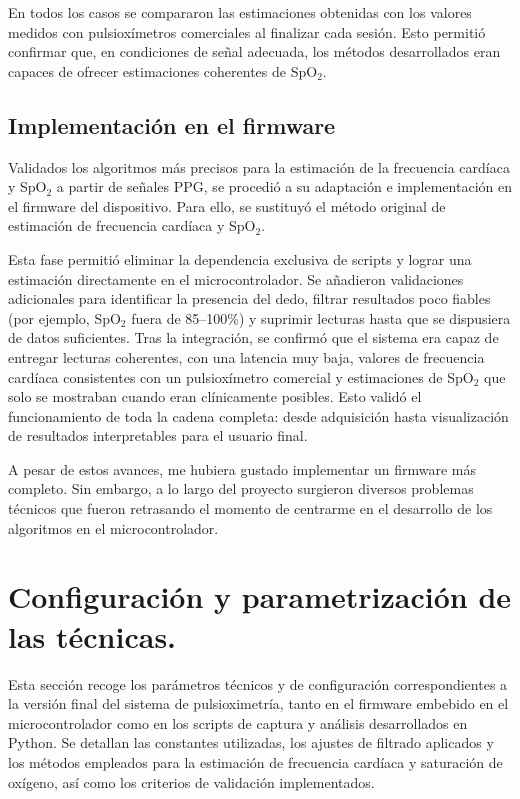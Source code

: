 En todos los casos se compararon las estimaciones obtenidas con los valores medidos con pulsioxímetros comerciales al finalizar cada sesión. Esto permitió confirmar que, en condiciones de señal adecuada, los métodos desarrollados eran capaces de ofrecer estimaciones coherentes de SpO$_2$.

\subsection{Implementación en el firmware}

Validados los algoritmos más precisos para la estimación de la frecuencia cardíaca y SpO$_2$ a partir de señales PPG, se procedió a su adaptación e implementación en el firmware del dispositivo. Para ello, se sustituyó el método original de estimación de frecuencia cardíaca y SpO$_2$.

Esta fase permitió eliminar la dependencia exclusiva de scripts y lograr una estimación directamente en el microcontrolador. Se añadieron validaciones adicionales para identificar la presencia del dedo, filtrar resultados poco fiables (por ejemplo, SpO$_2$ fuera de 85–100\%) y suprimir lecturas hasta que se dispusiera de datos suficientes. Tras la integración, se confirmó que el sistema era capaz de entregar lecturas coherentes, con una latencia muy baja, valores de frecuencia cardíaca consistentes con un pulsioxímetro comercial y estimaciones de SpO$_2$ que solo se mostraban cuando eran clínicamente posibles. Esto validó el funcionamiento de toda la cadena completa: desde adquisición hasta visualización de resultados interpretables para el usuario final.

A pesar de estos avances, me hubiera gustado implementar un firmware más completo. Sin embargo, a lo largo del proyecto surgieron diversos problemas técnicos que fueron retrasando el momento de centrarme en el desarrollo de los algoritmos en el microcontrolador.


\section{Configuración y parametrización de las técnicas.}

Esta sección recoge los parámetros técnicos y de configuración correspondientes a la versión final del sistema de pulsioximetría, tanto en el firmware embebido en el microcontrolador como en los scripts de captura y análisis desarrollados en Python. Se detallan las constantes utilizadas, los ajustes de filtrado aplicados y los métodos empleados para la estimación de frecuencia cardíaca y saturación de oxígeno, así como los criterios de validación implementados.

